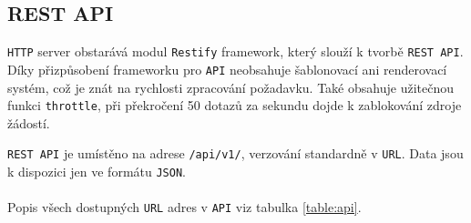 \documentclass[czech,BP]{thesiskiv}
\begin{document}
		
		
		
	
		\subsection{REST API}
		\texttt{HTTP} server obstarává modul \texttt{Restify} framework, který slouží k tvorbě \texttt{REST API}. Díky přizpůsobení frameworku pro \texttt{API} neobsahuje šablonovací ani renderovací systém, což je znát na rychlosti zpracování požadavku.
		Také obsahuje užitečnou funkci \texttt{throttle}, při překročení 50 dotazů za sekundu dojde k zablokování zdroje žádostí.		
		
		\texttt{REST API} je umístěno na adrese \texttt{/api/v1/}, verzování standardně v \texttt{URL}. Data jsou k dispozici jen ve formátu \texttt{JSON}. 
		\\\\
Popis všech dostupných \texttt{URL} adres v \texttt{API} viz tabulka \ref{table:api}.
\end{document}
